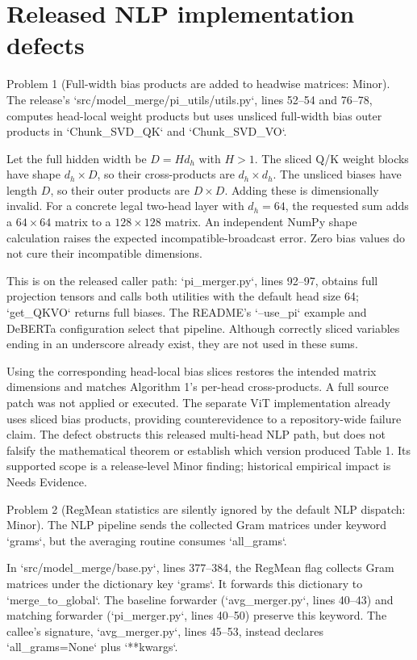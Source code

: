 \documentclass[10pt]{article}
\begin{document}
\section*{Released NLP implementation defects}
Problem 1 (Full-width bias products are added to headwise matrices: Minor).  The release’s `src/model\_merge/pi\_utils/utils.py`, lines 52–54 and 76–78, computes head-local weight products but uses unsliced full-width bias outer products in `Chunk\_SVD\_QK` and `Chunk\_SVD\_VO`.\par
Let the full hidden width be \(D=Hd_h\) with \(H>1\). The sliced Q/K weight blocks have shape \(d_h\times D\), so their cross-products are \(d_h\times d_h\). The unsliced biases have length \(D\), so their outer products are \(D\times D\). Adding these is dimensionally invalid. For a concrete legal two-head layer with \(d_h=64\), the requested sum adds a \(64\times64\) matrix to a \(128\times128\) matrix. An independent NumPy shape calculation raises the expected incompatible-broadcast error. Zero bias values do not cure their incompatible dimensions.\par
This is on the released caller path: `pi\_merger.py`, lines 92–97, obtains full projection tensors and calls both utilities with the default head size 64; `get\_QKVO` returns full biases. The README’s `–use\_pi` example and DeBERTa configuration select that pipeline. Although correctly sliced variables ending in an underscore already exist, they are not used in these sums.\par
Using the corresponding head-local bias slices restores the intended matrix dimensions and matches Algorithm 1’s per-head cross-products. A full source patch was not applied or executed. The separate ViT implementation already uses sliced bias products, providing counterevidence to a repository-wide failure claim. The defect obstructs this released multi-head NLP path, but does not falsify the mathematical theorem or establish which version produced Table 1. Its supported scope is a release-level Minor finding; historical empirical impact is Needs Evidence.\par
Problem 2 (RegMean statistics are silently ignored by the default NLP dispatch: Minor).  The NLP pipeline sends the collected Gram matrices under keyword `grams`, but the averaging routine consumes `all\_grams`.\par
In `src/model\_merge/base.py`, lines 377–384, the RegMean flag collects Gram matrices under the dictionary key `grams`. It forwards this dictionary to `merge\_to\_global`. The baseline forwarder (`avg\_merger.py`, lines 40–43) and matching forwarder (`pi\_merger.py`, lines 40–50) preserve this keyword. The callee’s signature, `avg\_merger.py`, lines 45–53, instead declares `all\_grams=None` plus `**kwargs`.\par
\end{document}
